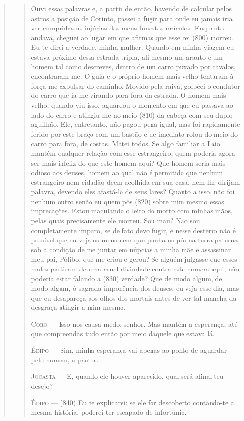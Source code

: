 \begin{verse}
\begin{verse}
Ouvi essas palavras e, a partir de então, havendo de calcular pelos
astros a posição de Corinto, passei a fugir para onde eu jamais iria ver
cumpridas as injúrias dos meus funestos oráculos. Enquanto andava,
cheguei ao lugar em que afirmas que esse rei (800) morreu. Eu te direi a
verdade, minha mulher. Quando em minha viagem eu estava próximo dessa
estrada tripla, ali mesmo um arauto e um homem tal como descreves,
dentro de um carro puxado por cavalos, encontraram-me. O guia e o
próprio homem mais velho tentaram à força me expulsar do caminho. Movido
pela raiva, golpeei o condutor do carro que ia me virando para fora da
estrada. O homem mais velho, quando viu isso, aguardou o momento em que
eu passava ao lado do carro e atingiu-me no meio (810) da cabeça com seu
duplo aguilhão. Ele, entretanto, não pagou pena igual, mas foi
rapidamente ferido por este braço com um bastão e de imediato rolou do
meio do carro para fora, de costas. Matei todos. Se algo familiar a Laio
mantém qualquer relação com esse estrangeiro, quem poderia agora ser
mais infeliz do que este homem aqui? Que homem seria mais odioso aos
deuses, homem ao qual não é permitido que nenhum estrangeiro nem cidadão
deem acolhida em sua casa, nem lhe dirijam palavra, devendo eles
afastá-lo de seus lares? Quanto a isso, não foi nenhum outro senão eu
quem pôs (820) sobre mim mesmo essas imprecações. Estou maculando o
leito do morto com minhas mãos, pelas quais precisamente ele morreu. Sou
mau? Não sou completamente impuro, se de fato devo fugir, e nesse
desterro não é possível que eu veja os meus nem que ponha os pés na
terra paterna, sob a condição de me juntar em núpcias a minha mãe e
assassinar meu pai, Pólibo, que me criou e gerou? Se alguém julgasse que
esses males partiram de uma cruel divindade contra este homem aqui, não
poderia estar falando a (830) verdade? Que de modo algum, de modo algum,
ó sagrada imponência dos deuses, eu veja esse dia, mas que eu desapareça
aos olhos dos mortais antes de ver tal mancha da desgraça atingir a mim
mesmo.

\textsc{Coro} --- Isso nos causa medo, senhor. Mas mantém a esperança, até que compreendas
tudo então por meio daquele que estava lá.

\textsc{Édipo} --- Sim, minha esperança vai apenas ao ponto de aguardar pelo homem, o
pastor.

\textsc{Jocasta} --- E, quando ele houver aparecido, qual será afinal teu desejo?

\textsc{Édipo} --- (840) Eu te explicarei: se ele for descoberto contando-te a mesma
história, poderei ter escapado do infortúnio.


\end{verse}
\end{verse}
